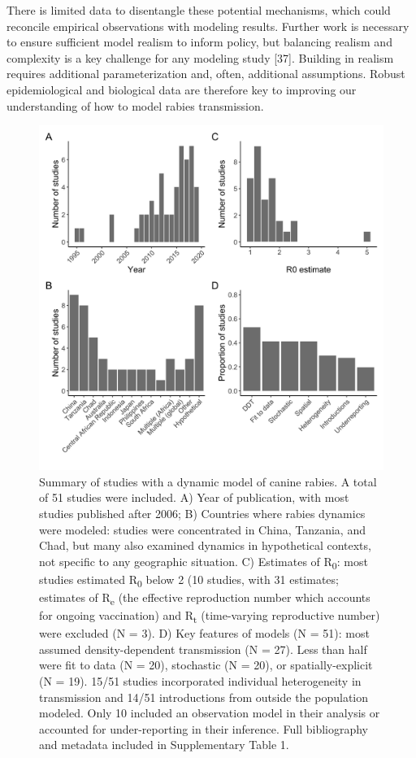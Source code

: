 \documentclass[
  oneside]{book}
\begin{document}
There is limited data to disentangle these potential mechanisms, which
could reconcile empirical observations with modeling results. Further
work is necessary to ensure sufficient model realism to inform policy,
but balancing realism and complexity is a key challenge for any modeling
study {[}37{]}. Building in realism requires additional parameterization
and, often, additional assumptions. Robust epidemiological and
biological data are therefore key to improving our understanding of how
to model rabies transmission.

\begin{figure}
\includegraphics[width=0.9\linewidth]{figs/ch3/image2} \caption[Summary of studies with a dynamic model of canine rabies.]{Summary of studies with a dynamic model of canine
rabies. A total of 51 studies were included. A) Year of publication,
with most studies published after 2006; B) Countries where rabies
dynamics were modeled: studies were concentrated in China, Tanzania, and
Chad, but many also examined dynamics in hypothetical contexts, not
specific to any geographic situation. C) Estimates of R\textsubscript{0}: most studies
estimated R\textsubscript{0} below 2 (10 studies, with 31 estimates; estimates of R\textsubscript{e}
(the effective reproduction number which accounts for ongoing
vaccination) and R\textsubscript{t} (time-varying reproductive number) were excluded
(N = 3). D) Key features of models (N = 51): most assumed
density-dependent transmission (N = 27). Less than half were fit to data
(N = 20), stochastic (N = 20), or spatially-explicit (N = 19). 15/51
studies incorporated individual heterogeneity in transmission and 14/51
introductions from outside the population modeled. Only 10 included an
observation model in their analysis or accounted for under-reporting in
their inference. Full bibliography and metadata included in
Supplementary Table 1.}\label{fig:ch4-fig2}
\end{figure}
\end{document}
